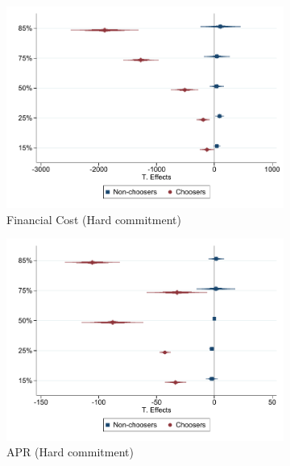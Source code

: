 \documentclass[oneside,11pt]{article}
\begin{document}
\begin{figure}[H]
    \caption{Non-experimental analysis of Choosers and Non-Choosers}
    \label{qreg_chooser_nonchooser}
    \begin{center}
    \begin{subfigure}{.45\textwidth}
      \caption{Financial Cost (Hard commitment)}
        \centering
        \includegraphics[width=\textwidth]{Figuras/qreg_hard_fc_admin.pdf}
    \end{subfigure}
     \begin{subfigure}{0.45\textwidth}
      \caption{APR (Hard commitment)}
       \centering
      \includegraphics[width=\textwidth]{Figuras/qreg_hard_apr.pdf}
    \end{subfigure}
    \begin{subfigure}{.45\textwidth}

\end{subfigure}
\end{center}
\end{figure}
\end{document}
